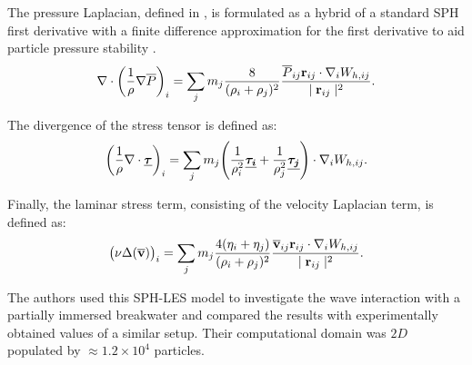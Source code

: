 The pressure Laplacian, defined in , is formulated as a hybrid of a standard SPH first derivative with a finite difference approximation for the first derivative to aid particle pressure stability \parencite{cummins1999sph}.
\begin{equation}
    \nabla \cdot \bigg( \frac{1}{\rho} \nabla \overline{P} \bigg)_i = \sum_j m_j \frac{8}{(\rho_i + \rho_j)^2} \frac{\overline{P}_{ij} \mathbf{r}_{ij} \cdot \nabla_{i} W_{h, ij} }{\mid \mathbf{r}_{ij} \mid^{2}}.
    \label{eq:Gotoh2004-p-laplacian-sph}
\end{equation}

The divergence of the stress tensor is defined as:
\begin{equation}
    \bigg( \frac{1}{\rho} \nabla \cdot \underline{\bm{\tau}} \bigg)_i = \sum_j m_j \Bigg( \frac{1}{\rho_i^2}\underline{\bm{\tau_i}} + \frac{1}{\rho_j^2}\underline{\bm{\tau_j}} \Bigg) \cdot \nabla_{i} W_{h, ij}.
    \label{eq:Gotoh2004-div-tau-sph}
\end{equation}

Finally, the laminar stress term, consisting of the velocity Laplacian term, is defined as:
\begin{equation}
    \big(\nu \Delta(\mathbf{\overline{v}}) \big)_i = \sum_j m_j \frac{4(\eta_i + \eta_j)}{(\rho_i + \rho_j)^2}\frac{\mathbf{\overline{v}}_{ij} \mathbf{r}_{ij} \cdot \nabla_{i} W_{h, ij}}{\mid \mathbf{r}_{ij} \mid^{2}}.
    \label{eq:Gotoh2004-vel-laplacian-sph}
\end{equation}

The authors used this SPH-LES model to investigate the wave interaction with a partially immersed breakwater and compared the results with experimentally obtained values of a similar setup. Their computational domain was $2D$ populated by $\approx 1.2 \times  10^4$ particles.

